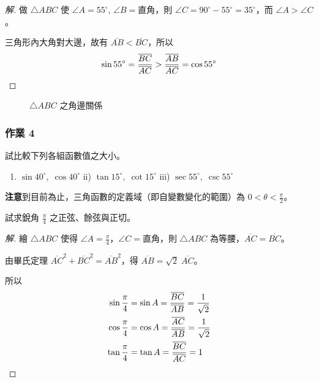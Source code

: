 \begin{proof}[解]
做 $\triangle ABC$ 使 $\angle A = 55^\circ$, $\angle B = \text{直角}$，則 $\angle C = 90^\circ - 55^\circ = 35^\circ$，而 $\angle A > \angle C$。

三角形內大角對大邊，故有 $\overline{AB} < \overline{BC}$，所以
\[ \sin 55^\circ = \frac{\overline{BC}}{\overline{AC}} > \frac{\overline{AB}}{\overline{AC}} = \cos 55^\circ \qedhere \]
\end{proof}

\begin{figure}[H]
\centering
{}
\caption{$\triangle ABC$ 之角邊關係}
\label{fig:b3s-fig2-20}
\end{figure}

\subsubsection*{作業 4}
試比較下列各組函數值之大小。
\begin{enumerate}[label=\roman*), leftmargin=2.5em]
  \item $\sin 40^\circ,\; \cos 40^\circ$ \qquad ii) $\tan 15^\circ,\; \cot 15^\circ$ \qquad iii) $\sec 55^\circ,\; \csc 55^\circ$
\end{enumerate}

\textbf{注意}\quad 到目前為止，三角函數的定義域（即自變數變化的範圍）為 $0 < \theta < \frac{\pi}{2}$。

\begin{example}
試求銳角 $\frac{\pi}{4}$ 之正弦、餘弦與正切。
\end{example}

\begin{proof}[解]
繪 $\triangle ABC$ 使得 $\angle A = \frac{\pi}{4}$，$\angle C = \text{直角}$，則 $\triangle ABC$ 為等腰，$\overline{AC} = \overline{BC}$。

由畢氏定理 $\overline{AC}^2 + \overline{BC}^2 = \overline{AB}^2$，得 $\overline{AB} = \sqrt{2}\;\overline{AC}$。

所以
\begin{align*}
\sin\frac{\pi}{4} &= \sin A = \frac{\overline{BC}}{\overline{AB}} = \frac{1}{\sqrt{2}} \\
\cos\frac{\pi}{4} &= \cos A = \frac{\overline{AC}}{\overline{AB}} = \frac{1}{\sqrt{2}} \\
\tan\frac{\pi}{4} &= \tan A = \frac{\overline{BC}}{\overline{AC}} = 1 \qedhere
\end{align*}
\end{proof}

